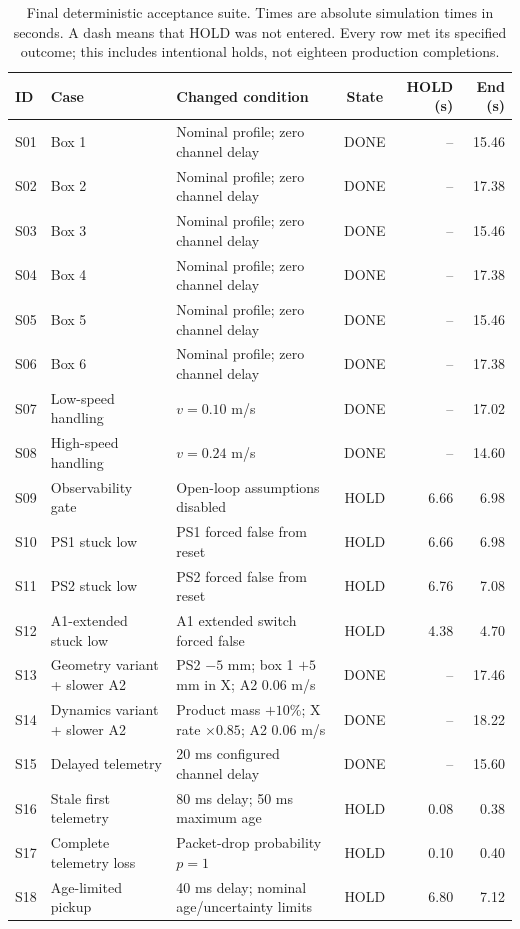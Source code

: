 \begin{table}[t]
\centering\small
\caption{Final deterministic acceptance suite. Times are absolute simulation times in seconds. A dash means that HOLD was not entered. Every row met its specified outcome; this includes intentional holds, not eighteen production completions.}
\label{tab:cases}
\begin{tabular*}{\textwidth}{@{\extracolsep{\fill}}l p{} p{} c r r@{}}
\toprule ID & Case & Changed condition & State & HOLD (s) & End (s)\\\midrule
S01 & Box 1 & Nominal profile; zero channel delay & DONE & -- & 15.46\\
S02 & Box 2 & Nominal profile; zero channel delay & DONE & -- & 17.38\\
S03 & Box 3 & Nominal profile; zero channel delay & DONE & -- & 15.46\\
S04 & Box 4 & Nominal profile; zero channel delay & DONE & -- & 17.38\\
S05 & Box 5 & Nominal profile; zero channel delay & DONE & -- & 15.46\\
S06 & Box 6 & Nominal profile; zero channel delay & DONE & -- & 17.38\\
S07 & Low-speed handling & $v=0.10$ m/s & DONE & -- & 17.02\\
S08 & High-speed handling & $v=0.24$ m/s & DONE & -- & 14.60\\
S09 & Observability gate & Open-loop assumptions disabled & HOLD & 6.66 & 6.98\\
S10 & PS1 stuck low & PS1 forced false from reset & HOLD & 6.66 & 6.98\\
S11 & PS2 stuck low & PS2 forced false from reset & HOLD & 6.76 & 7.08\\
S12 & A1-extended stuck low & A1 extended switch forced false & HOLD & 4.38 & 4.70\\
S13 & Geometry variant + slower A2 & PS2 $-5$ mm; box 1 $+5$ mm in X; A2 0.06 m/s & DONE & -- & 17.46\\
S14 & Dynamics variant + slower A2 & Product mass $+10\%$; X rate $\times0.85$; A2 0.06 m/s & DONE & -- & 18.22\\
S15 & Delayed telemetry & 20 ms configured channel delay & DONE & -- & 15.60\\
S16 & Stale first telemetry & 80 ms delay; 50 ms maximum age & HOLD & 0.08 & 0.38\\
S17 & Complete telemetry loss & Packet-drop probability $p=1$ & HOLD & 0.10 & 0.40\\
S18 & Age-limited pickup & 40 ms delay; nominal age/uncertainty limits & HOLD & 6.80 & 7.12\\
\bottomrule\end{tabular*}
\end{table}